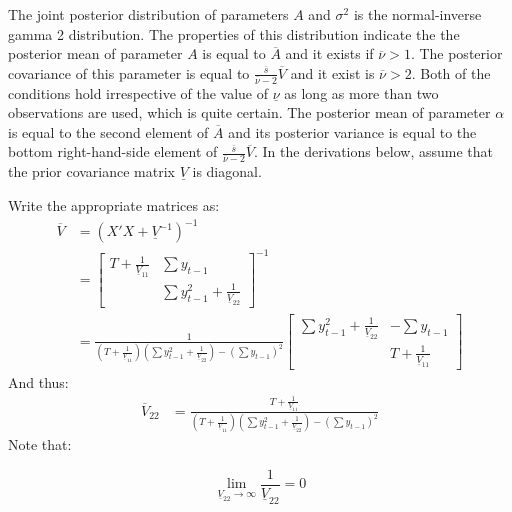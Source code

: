 \documentclass[
  letterpaper,
  DIV=11,
  numbers=noendperiod]{scrreprt}
\begin{document}
The joint posterior distribution of parameters \(A\) and \(\sigma^2\) is
the normal-inverse gamma 2 distribution. The properties of this
distribution indicate the the posterior mean of parameter \(A\) is equal
to \(\overline{A}\) and it exists if \(\overline{\nu}>1\). The posterior
covariance of this parameter is equal to
\(\frac{\overline{s}}{\overline{\nu}-2}\overline{V}\) and it exist is
\(\overline{\nu}>2\). Both of the conditions hold irrespective of the
value of \(\underline{\nu}\) as long as more than two observations are
used, which is quite certain. The posterior mean of parameter \(\alpha\)
is equal to the second element of \(\overline{A}\) and its posterior
variance is equal to the bottom right-hand-side element of
\(\frac{\overline{s}}{\overline{\nu}-2}\overline{V}\). In the
derivations below, assume that the prior covariance matrix
\(\underline{V}\) is diagonal.

Write the appropriate matrices as: \begin{align*}
\overline{V} &= \left( X'X + \underline{V}^{-1}\right)^{-1}\\
 &= 
\begin{bmatrix}
T + \frac{1}{\underline{V}_{11}} & \sum y_{t-1}\\ & \sum y_{t-1}^2 + \frac{1}{\underline{V}_{22}} 
\end{bmatrix}^{-1}\\
&= \frac{1}{ \left( T + \frac{1}{\underline{V}_{11}} \right)\left(\sum y_{t-1}^2 + \frac{1}{\underline{V}_{22}} \right) - \left( \sum y_{t-1}\right)^2 }
\begin{bmatrix}
\sum y_{t-1}^2 + \frac{1}{\underline{V}_{22}}  & -\sum y_{t-1}\\ & T + \frac{1}{\underline{V}_{11}}
\end{bmatrix}
\end{align*} And thus: \begin{align*}
\overline{V}_{22} &=  \frac{T + \frac{1}{\underline{V}_{11}}}{ \left( T + \frac{1}{\underline{V}_{11}} \right)\left(\sum y_{t-1}^2 + \frac{1}{\underline{V}_{22}} \right) - \left( \sum y_{t-1}\right)^2 }
\end{align*} Note that:

\[ \lim_{\underline{V}_{22}\rightarrow\infty} \frac{1}{\underline{V}_{22}}=0\]
\end{document}
